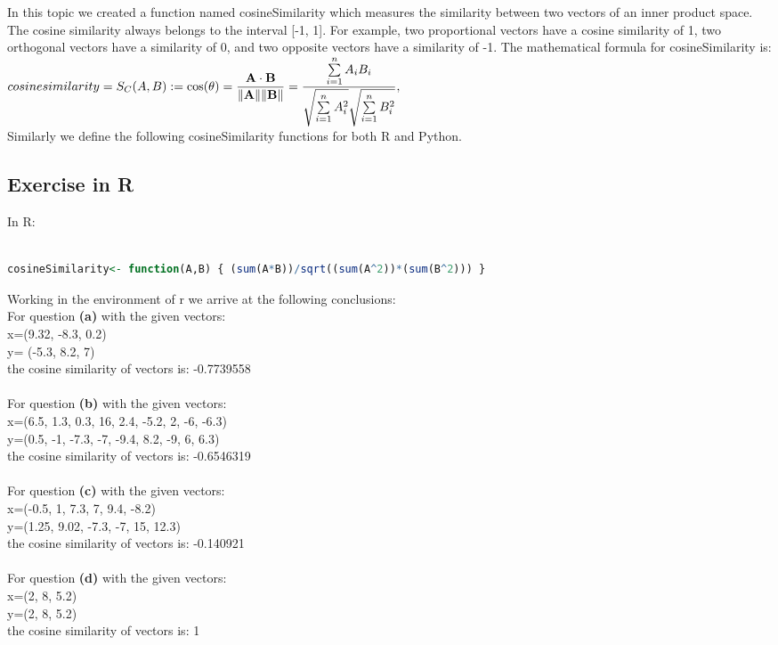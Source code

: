 \documentclass[10pt,a4paper]{article}
\begin{document}
	In this topic we created a function named cosineSimilarity which measures the similarity between two vectors of an inner product space. The cosine similarity always belongs to the interval [-1, 1]. For example, two proportional vectors have a cosine similarity of 1, two orthogonal vectors have a similarity of 0, and two opposite vectors have a similarity of -1. The mathematical formula for cosineSimilarity is: 
	\\
	${\displaystyle {{cosine similarity}}=S_{C}(A,B):=\cos(\theta )={\mathbf {A} \cdot \mathbf {B} \over \|\mathbf {A} \|\|\mathbf {B} \|}={\frac {\sum \limits _{i=1}^{n}{A_{i}B_{i}}}{{\sqrt {\sum \limits _{i=1}^{n}{A_{i}^{2}}}}{\sqrt {\sum \limits _{i=1}^{n}{B_{i}^{2}}}}}},}$
	\\ Similarly we define the following cosineSimilarity functions for both R and Python. 
	\subsection{Exercise in R}
	In R:	
	\begin{lstlisting}[language=R] 
		
cosineSimilarity<- function(A,B) { (sum(A*B))/sqrt((sum(A^2))*(sum(B^2))) }
	\end{lstlisting}
	
	Working in the environment of r we arrive at the following conclusions:
	\\
	For question \textbf{(a)} with the given vectors:
	\\x=(9.32, -8.3, 0.2) 
	\\y= (-5.3, 8.2, 7)
	\\the cosine similarity of vectors is: -0.7739558
	\\
	\\For question \textbf{(b)} with the given vectors:
	\\x=(6.5, 1.3, 0.3, 16, 2.4, -5.2, 2, -6, -6.3) 
	\\y=(0.5, -1, -7.3, -7, -9.4, 8.2, -9, 6, 6.3)
	\\the cosine similarity of vectors is: -0.6546319
	\\
	\\For question \textbf{(c)} with the given vectors:
	\\x=(-0.5, 1, 7.3, 7, 9.4, -8.2) 
	\\y=(1.25, 9.02, -7.3, -7, 15, 12.3)
	\\the cosine similarity of vectors is: -0.140921
	\\
	\\For question \textbf{(d)} with the given vectors:
	\\x=(2, 8, 5.2) 
	\\y=(2, 8, 5.2)
	\\the cosine similarity of vectors is: 1
	
\end{document}
